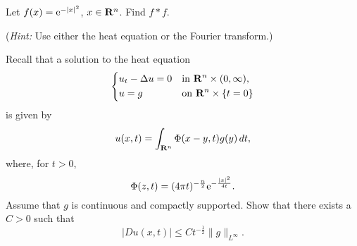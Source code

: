 \begin{problem}
  Let \(f(x)=\mathrm{e}^{-|x|^2}\), \(x\in\mathbf{R}^n\). Find \(f*f\).

  \noindent (\emph{Hint:} Use either the heat equation or the Fourier
  transform.)
\end{problem}
\begin{solution*}
\end{solution*}

\begin{problem}
  Recall that a solution to the heat equation
  \[
    \left\{
      \begin{aligned}
        &u_t-\Delta u=0&&\text{in \(\mathbf{R}^n\times(0,\infty)\),}\\
        &u=g&&\text{on \(\mathbf{R}^n\times\{t=0\}\)}
      \end{aligned}
    \right.
  \]
  is given by
  \[
    u(x,t)=\int_{\mathbf{R}^n}\Phi(x-y,t)g(y)\mathop{}\!d t,
  \]
  where, for \(t>0\),
  \[
    \Phi(z,t)=(4\pi t)^{-\frac{n}{2}}\mathrm{e}^{-\frac{|x|^2}{4t}}.
  \]
  Assume that \(g\) is continuous and compactly supported. Show that there
  exists a \(C>0\) such that
  \[
    |D u(x,t)|\leq Ct^{-\frac{1}{2}}\|g\|_{L^\infty}.
  \]
\end{problem}
\begin{solution*}
\end{solution*}

